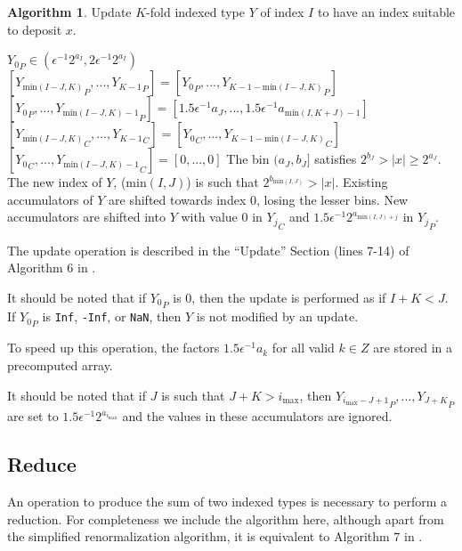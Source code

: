 \documentclass[12pt]{article}
\providecommand{\min}{\ensuremath{\text{min}}}
\providecommand{\max}{\ensuremath{\text{max}}}
\theoremstyle{definition}
\newtheorem{alg}{Algorithm}[section]
\numberwithin{equation}{section}
\numberwithin{figure}{section}
\begin{document}
    \begin{samepage}
    \begin{alg}
      Update $K$-fold indexed type $Y$ of index $I$ to have an index suitable to deposit $x$.
      \begin{algorithmic}[1]
        \Require
          \Statex ${Y_0}_P \in (\epsilon^{-1}  2^{a_{I}}, 2  \epsilon^{-1}  2^{a_I})$
          \State {}
          \State {}
            \State $[{Y_{\min(I - J, K)}}_P, ..., {Y_{K - 1}}_P] = [{Y_0}_P, ..., {Y_{K - 1 - \min(I - J, K)}}_P]$
            \State $[{Y_0}_P, ..., {Y_{\min(I - J, K) - 1}}_P] = [1.5  \epsilon^{-1}  a_{J}, ..., 1.5  \epsilon^{-1}  a_{\min(I, K + J) - 1}]$
            \State $[{Y_{\min(I - J, K)}}_C, ..., {Y_{K - 1}}_C] = [{Y_0}_C, ..., {Y_{K - 1 - \min(I - J, K)}}_C]$
            \State $[{Y_0}_C, ..., {Y_{\min(I - J, K) - 1}}_C] = [0, ..., 0]$
          \EndIf
        \EndFunction
        \Ensure
          \Statex The bin $(a_{J}, b_{J}]$ satisfies $2^{b_{J}} > |x| \geq 2^{a_{J}}$.
          \Statex The new index of $Y$, ($\min(I, J)$) is such that $2^{b_{\min(I, J)}} > |x|$.
          \Statex Existing accumulators of $Y$ are shifted towards index $0$, losing the lesser bins.
          \Statex New accumulators are shifted into $Y$ with value $0$ in ${Y_j}_C$ and $1.5  \epsilon^{-1}  2^{a_{\min(I, J) + j}}$ in ${Y_j}_P$.
      \end{algorithmic}
      \label{alg:update}
    \end{alg}
    \end{samepage}

    The update operation is described in the ``Update'' Section (lines 7-14) of Algorithm $6$ in \cite{repsum}.

    It should be noted that if ${Y_0}_P$ is 0, then the update is performed as if $I + K < J$. If ${Y_0}_P$ is \texttt{Inf}, \texttt{-Inf}, or \texttt{NaN}, then $Y$ is not modified by an update.

    To speed up this operation, the factors $1.5  \epsilon^{-1}  a_k$ for all valid $k \in Z$ are stored in a precomputed array.

    It should be noted that if $J$ is such that $J + K > i_{\max}$, then ${Y_{i_{\max} - J + 1}}_P, ...,  {Y_{J + K}}_P$ are set to $1.5 \epsilon^{-1}2^{a_{i_{\max}}}$ and the values in these accumulators are ignored.

  \subsection{Reduce}
    \label{sec:primitiveops_reduce}
    An operation to produce the sum of two indexed types is necessary to perform a reduction. For completeness we include the algorithm here, although apart from the simplified renormalization algorithm, it is equivalent to Algorithm $7$ in \cite{repsum}.
\end{document}
